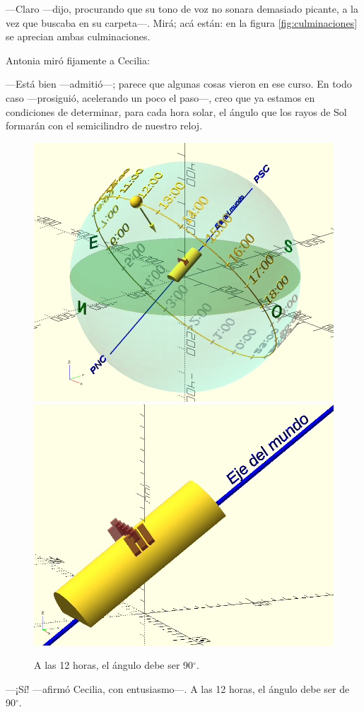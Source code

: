 ---Claro ---dijo, procurando que su tono de voz no sonara demasiado
picante, a la vez que buscaba en su carpeta---. Mirá; acá están: en la
figura \ref{fig:culminaciones} se aprecian ambas culminaciones.


Antonia miró fijamente a Cecilia:

---Está bien ---admitió---; parece que algunas cosas vieron en ese
curso. En todo caso ---prosiguió, acelerando un poco el paso---, creo
que ya estamos en condiciones de determinar, para cada hora solar, el
ángulo que los rayos de Sol formarán con el semicilindro de nuestro
reloj.

\begin{figure}[ht]
  \centering
  \includegraphics[width=.55\textwidth,valign=c]{imagenes/sol-culminacion-superior.png}\hfill
  \includegraphics[width=.44\textwidth,valign=c]{imagenes/hora-12-alfa-90}
   \caption{A las 12 horas, el ángulo debe ser 90$^{\circ}$.}
  \label{fig:hora-12}
\end{figure}


---¡Sí! ---afirmó Cecilia, con entusiasmo---. A las 12 horas, el
ángulo debe ser de 90$^{\circ}$.

